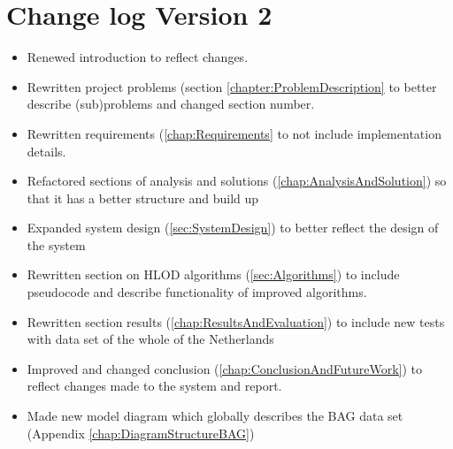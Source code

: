 \chapter{Change log Version 2}
\label{chap:changelog}
\begin{itemize}
  \item Renewed introduction to reflect changes.
  \item Rewritten project problems (section \ref{chapter:ProblemDescription} to better describe (sub)problems and changed section number. \\
  \item Rewritten requirements (\ref{chap:Requirements} to not include implementation details. \\
  \item Refactored sections of analysis and solutions (\ref{chap:AnalysisAndSolution}) so that it has a better structure and build up\\
  \item Expanded system design (\ref{sec:SystemDesign}) to better reflect the design of the system\\
  \item Rewritten section on HLOD algorithms (\ref{sec:Algorithms}) to include pseudocode and describe functionality of improved algorithms.
  \item Rewritten section results (\ref{chap:ResultsAndEvaluation}) to include new tests with data set of the whole of the Netherlands
  \item Improved and changed conclusion (\ref{chap:ConclusionAndFutureWork}) to reflect changes made to the system and report.
  \item Made new model diagram which globally describes the BAG data set (Appendix \ref{chap:DiagramStructureBAG})
\end{itemize}
